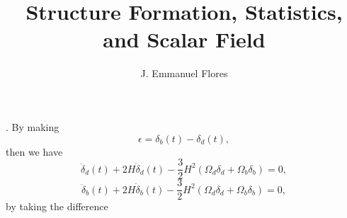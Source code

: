 \documentclass[11pt]{article}
\title{Structure Formation, Statistics, and Scalar Field}
\author{J. Emmanuel Flores}
\begin{document}
. By making 
\begin{displaymath}
  \epsilon = \delta_b(t) - \delta_d(t),
\end{displaymath}
then we have
\begin{displaymath}
  \ddot\delta_d(t) + 2H\dot\delta_d(t) - \frac{3}{2}H^2(\Omega_d\delta_d +\Omega_b\delta_b)=0,
\end{displaymath}
\begin{displaymath}
  \ddot\delta_b(t) + 2H\dot\delta_b(t) - \frac{3}{2}H^2(\Omega_d\delta_d +\Omega_b\delta_b)=0,
\end{displaymath}
by taking the difference 
\end{document}
